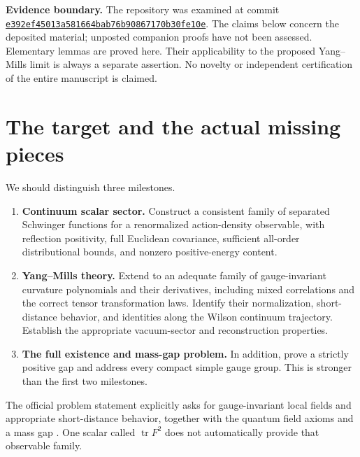 \documentclass[11pt]{article}
\theoremstyle{remark}
\newcommand{\tr}{\operatorname{tr}}
\begin{document}
\noindent\textbf{Evidence boundary.}
The repository was examined at commit
\href{https://github.com/ethanwsussman/Yang--Mills-LLM-experiment/tree/e392ef45013a581664bab76b90867170b30fe10e}
{\texttt{e392ef4501\allowbreak 3a581664ba\allowbreak b76b908671\allowbreak 70b30fe10e}}.
The claims below concern the deposited material; unposted companion proofs
have not been assessed. Elementary lemmas are proved here. Their applicability
to the proposed Yang--Mills limit is always a separate assertion.
No novelty or independent certification of the entire manuscript is claimed.

\section{The target and the actual missing pieces}

We should distinguish three milestones.
\begin{enumerate}
\item \textbf{Continuum scalar sector.}
Construct a consistent family of separated Schwinger functions for a
renormalized action-density observable, with reflection positivity, full
Euclidean covariance, sufficient all-order distributional bounds, and
nonzero positive-energy content.
\item \textbf{Yang--Mills theory.}
Extend to an adequate family of gauge-invariant curvature polynomials and
their derivatives, including mixed correlations and the correct tensor
transformation laws. Identify their normalization, short-distance behavior,
and identities along the Wilson continuum trajectory. Establish the
appropriate vacuum-sector and reconstruction properties.
\item \textbf{The full existence and mass-gap problem.}
In addition, prove a strictly positive gap and address every compact simple
gauge group. This is stronger than the first two milestones.
\end{enumerate}
The official problem statement explicitly asks for gauge-invariant local
fields and appropriate short-distance behavior, together with the quantum
field axioms and a mass gap \cite{clay}. One scalar called
$\tr F^2$ does not automatically provide that observable family.
\end{document}

